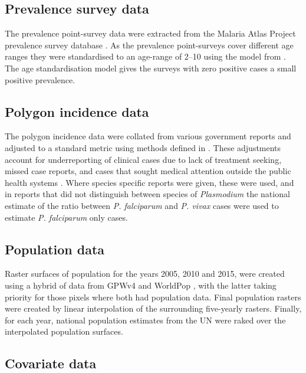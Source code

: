 \documentclass[10pt,letterpaper]{article}
\begin{document}
\subsection*{Prevalence survey data}

The prevalence point-survey data were extracted from the Malaria Atlas Project prevalence survey database \cite{bhatt2015effect, guerra2007assembling, gething2011new, pfeffer2018ma}.
As the prevalence point-surveys cover different age ranges they were standardised to an age-range of 2--10 using the model from \cite{smith2007standardizing}.
The age standardisation model gives the surveys with zero positive cases a small positive prevalence.

\subsection*{Polygon incidence data}


The polygon incidence data were collated from various government reports and adjusted to a standard metric using methods defined in \cite{cibulskis2011worldwide}.
These adjustments account for underreporting of clinical cases due to lack of treatment seeking, missed case reports, and cases that sought medical attention outside the public health systems \cite{battle2016treatment}.
Where species specific reports were given, these were used, and in reports that did not distinguish between species of \emph{Plasmodium} the national estimate of the ratio between \emph{P. falciparum} and \emph{P. vivax} cases were used to estimate \emph{P. falciparum} only cases.



\subsection*{Population data}

Raster surfaces of population for the years 2005, 2010 and 2015, were created using a hybrid of data from GPWv4 \cite{gpw4} and WorldPop \cite{tatem2017worldpop}, with the latter taking priority for those pixels where both had population data. 
Final population rasters were created by linear interpolation of the surrounding five-yearly rasters.
Finally, for each year, national population estimates from the UN were raked over the interpolated population surfaces. 

\subsection*{Covariate data}
\end{document}
